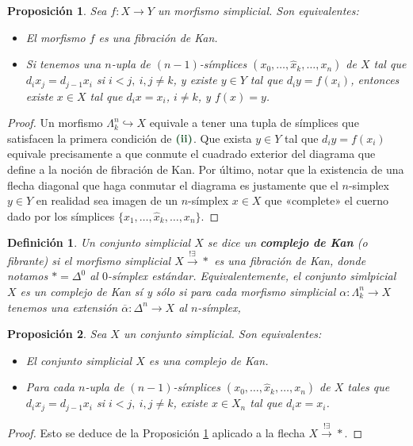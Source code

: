 \documentclass[11pt]{report}
\theoremstyle{colored}
\newtheorem{definition}{Definición}[section]
\newtheorem{proposition}{Proposición}[section]
\renewcommand{\ss}[1]{\Delta^{#1}}
\newcommand{\horn}[2]{\Lambda^{#1}_{#2}}
\newcommand{\guill}[1]{«#1»}
\newcommand{\paint}[1]{\color{color}{#1}}
\newcommand{\tpaint}[1]{\paint{\textbf{#1}}}
\begin{document}
\begin{proposition}\label{equiv-fib-kan} Sea $f : X \to Y$ un morfismo simplicial. Son equivalentes:
\begin{itemize}
\item[(i)] El morfismo $f$ es una fibración de Kan.
\item[(ii)] Si tenemos una $n$-upla de $(n-1)$-símplices $(x_0,\dots,\widehat{x}_k,\dots, x_n)$ de $X$ tal que $d_ix_j = d_{j-1}x_i$ si $i < j, \ i,j \neq k$, y existe $y \in Y$ tal que $d_iy = f(x_i)$, entonces existe $x \in X$ tal que $d_ix = x_i$, $i \neq k$, y $f(x) = y$.
\end{itemize}
\end{proposition}
\begin{proof} Un morfismo $\horn{n}{k} \hookrightarrow X$ equivale a tener una tupla de símplices que satisfacen la primera condición de $\tpaint{(ii)}$. Que exista $y \in Y$ tal que $d_iy = f(x_i)$ equivale precisamente a que conmute el cuadrado exterior del diagrama que define a la noción de fibración de Kan. Por último, notar que la existencia de una flecha diagonal que haga conmutar el diagrama es justamente que el $n$-simplex $y \in Y$ en realidad sea imagen de un $n$-símplex $x \in X$ que \guill{complete} el cuerno dado por los símplices $\{x_1, \dots, \widehat{x}_k,\dots, x_n\}$.
\end{proof}

\begin{definition} Un conjunto simplicial $X$ se dice un \textbf{complejo de Kan} (o fibrante) si el morfismo simplicial $X \xrightarrow{!\exists} \ast$ es una fibración de Kan, donde notamos $\ast = \ss{0}$ al $0$-símplex estándar. Equivalentemente, el conjunto simlpicial $X$ es un complejo de Kan sí y sólo si para cada morfismo simplicial $\alpha : \horn{n}{k} \to X$ tenemos una extensión $\overline{\alpha} : \ss{n} \to X$ al $n$-símplex,
\begin{center}
\end{center}
\end{definition}

\begin{proposition} Sea $X$ un conjunto simplicial. Son equivalentes:
\begin{itemize}
\item[(i)] El conjunto simplicial $X$ es una complejo de Kan.
\item[(ii)] Para cada $n$-upla de $(n-1)$-símplices $(x_0,\dots,\widehat{x}_k,\dots, x_n)$ de $X$ tales que $d_ix_j = d_{j-1}x_i$ si $i < j, \ i,j \neq k$, existe $x \in X_n$ tal que $d_ix = x_i$.
\end{itemize}
\end{proposition}
\begin{proof} Esto se deduce de la Proposición \ref{equiv-fib-kan} aplicado a la flecha $X \xrightarrow{! \exists} \ast$.
\end{proof}
\end{document}
